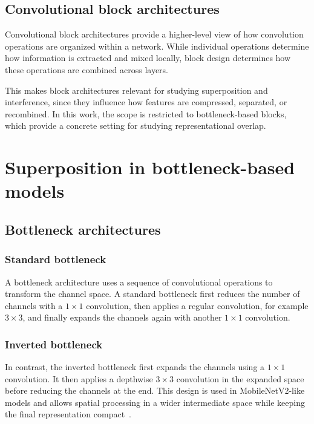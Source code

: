 \documentclass[12pt,a4paper]{report}
\begin{document}
\subsection{Convolutional block architectures}
Convolutional block architectures provide a higher-level view of how convolution operations are organized within a network. While individual operations determine how information is extracted and mixed locally, block design determines how these operations are combined across layers.

This makes block architectures relevant for studying superposition and interference, since they influence how features are compressed, separated, or recombined. In this work, the scope is restricted to bottleneck-based blocks, which provide a concrete setting for studying representational overlap.

\section{Superposition in bottleneck-based models}

\subsection{Bottleneck architectures}

\subsubsection{Standard bottleneck}
A bottleneck architecture uses a sequence of convolutional operations to transform the channel space. A standard bottleneck first reduces the number of channels with a \(1 \times 1\) convolution, then applies a regular convolution, for example \(3 \times 3\), and finally expands the channels again with another \(1 \times 1\) convolution.

\subsubsection{Inverted bottleneck}
In contrast, the inverted bottleneck first expands the channels using a \(1 \times 1\) convolution. It then applies a depthwise \(3 \times 3\) convolution in the expanded space before reducing the channels at the end. This design is used in MobileNetV2-like models and allows spatial processing in a wider intermediate space while keeping the final representation compact~\cite{hollard2025}.
\end{document}
